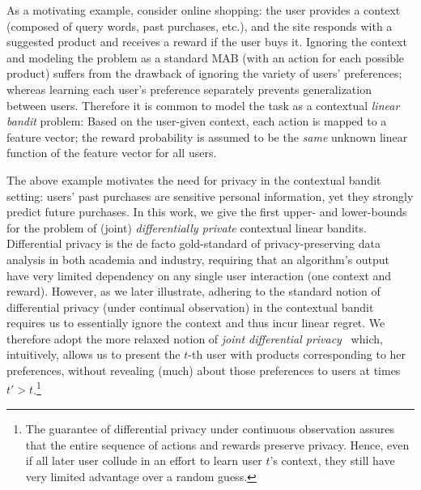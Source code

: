 \documentclass{article}
\begin{document}

As a motivating example, consider online shopping: the user provides a
context (composed of query words, past purchases, etc.), and the site
responds with a suggested product and receives a reward if the user
buys it.  Ignoring the context and modeling the problem as a standard
MAB (with an action for each possible product) suffers from the
drawback of ignoring the variety of users' preferences; whereas
learning each user's preference separately prevents generalization
between users.  Therefore it is common to model the task as a
contextual \emph{linear bandit} problem: Based on the user-given
context, each action is mapped to a feature vector; the
reward probability is assumed to be the \emph{same} unknown linear
function of the feature vector for all users.

The above example motivates the need for privacy in the contextual
bandit setting: users' past purchases are sensitive personal
information, yet they strongly predict future purchases.
In this work, we give the first upper- and lower-bounds for the
problem of (joint) \emph{differentially private} contextual linear
bandits.  Differential privacy is the de facto gold-standard of
privacy-preserving data analysis in both academia and industry,
requiring that an algorithm's output have very limited dependency on
any single user interaction (one context and reward).  However, as we
later illustrate, adhering to the standard notion of differential
privacy (under continual observation) in the contextual bandit
requires us to essentially ignore the context and thus incur linear
regret.  We therefore adopt the more relaxed notion of \emph{joint
  differential privacy}~\citep{KearnsMechanismDesign2014} which,
intuitively, allows us to present the $t$-th user with products
corresponding to her preferences, without revealing (much) about those
preferences to users at times $t'>t$.\footnote{The guarantee of
  differential privacy under continuous observation assures that the
  entire sequence of actions and rewards preserve privacy.  Hence,
  even if all later user collude in an effort to learn user $t$'s
  context, they still have very limited advantage over a random
  guess.}
\end{document}
